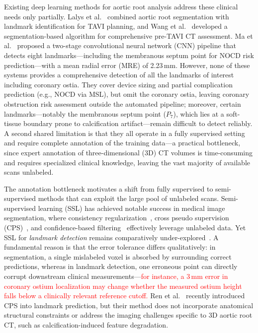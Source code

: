 \documentclass[conference]{IEEEtran}
\begin{document}
Existing deep learning methods for aortic root analysis address these clinical needs only partially. Lalys et al.~\cite{Lalys2019_tavi_segmentation} combined aortic root segmentation with landmark identification for TAVI planning, and Wang et al.~\cite{Wang2023_pretavr_dl} developed a segmentation-based algorithm for comprehensive pre-TAVI CT assessment. Ma et al.~\cite{Ma2023_aortic_landmarks} proposed a two-stage convolutional neural network (CNN) pipeline that detects eight landmarks---including the membranous septum point for NOCD risk prediction---with a mean radial error (MRE) of 2.23\,mm. However, none of these systems provides a comprehensive detection of all the landmarks of interest including coronary ostia. They cover device sizing and partial complication prediction (e.g., NOCD via MSL), but omit the coronary ostia, leaving coronary obstruction risk assessment outside the automated pipeline; moreover, certain landmarks---notably the membranous septum point ($P_7$), which lies at a soft-tissue boundary prone to calcification artifact---remain difficult to detect reliably. A second shared limitation is that they all operate in a fully supervised setting and require complete annotation of the training data---a practical bottleneck, since expert annotation of three-dimensional (3D) CT volumes is time-consuming and requires specialized clinical knowledge, leaving the vast majority of available scans unlabeled.

The annotation bottleneck motivates a shift from fully supervised to semi-supervised methods that can exploit the large pool of unlabeled scans. Semi-supervised learning (SSL) has achieved notable success in medical image segmentation, where consistency regularization~\cite{Tarvainen2017_mean_teacher,Laine2017_temporal_ensembling}, cross pseudo supervision (CPS)~\cite{Chen2021_cps}, and confidence-based filtering~\cite{Sohn2020_fixmatch} effectively leverage unlabeled data. Yet SSL for \emph{landmark detection} remains comparatively under-explored~\cite{Dong2019_teacher_students,Honari2018_ssl_landmarks,Kim2023_hybridmatch}. A fundamental reason is that the error tolerance differs qualitatively: in segmentation, a single mislabeled voxel is absorbed by surrounding correct predictions, whereas in landmark detection, one erroneous point can directly corrupt downstream clinical measurements---\textcolor{red}{for instance, a 3\,mm error in coronary ostium localization may change whether the measured ostium height falls below a clinically relevant reference cutoff.} Ren et al.~\cite{Ren2024_g2lcps} recently introduced CPS into landmark prediction, but their method does not incorporate anatomical structural constraints or address the imaging challenges specific to 3D aortic root CT, such as calcification-induced feature degradation.
\end{document}
